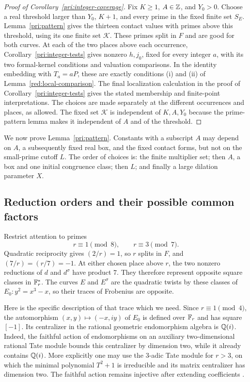 \begin{proof}[Proof of Corollary~\ref{pri:integer-coverage}]
Fix \(K\ge1\), \(A\in\mathbb Z\), and \(Y_0>0\).  Choose a real threshold
larger than \(Y_0\), \(K+1\), and every prime in the fixed finite set
\(S_E\).  Lemma~\ref{pri:pattern} gives the thirteen contact values
with primes above this threshold, using its one finite set
\(\mathcal K\).  These primes split in \(F\) and are good for both
curves.  At each of the two places above each occurrence,
Corollary~\ref{pri:integer-tests} gives nonzero \(h,j_0\), fixed for
every integer \(a\), with its two formal-kernel conditions and valuation
comparisons.  In the identity embedding with \(T_a=aP\), these are exactly
conditions (i) and (ii) of Lemma~\ref{red:local-comparison}.  The final
localization calculation in the proof of Corollary~\ref{pri:integer-tests}
gives the stated membership and finite-point interpretations.  The choices
are made separately at the different occurrences and places, as allowed.
The fixed set \(\mathcal K\) is independent of \(K,A,Y_0\) because the
prime-pattern lemma makes it independent of \(A\) and of the threshold.
\end{proof}

We now prove Lemma~\ref{pri:pattern}. Constants with a subscript $A$ may
depend on $A$, a subsequently fixed real box, and the fixed contact
forms, but not on the small-prime cutoff $L$. The order of choices is:
the finite multiplier set; then $A$, a box and one initial congruence
class; then $L$; and finally a large dilation parameter $X$.

\subsection{Reduction orders and their possible common factors}

Restrict attention to primes
\begin{equation}\label{pri:prime-residues}
                         r\equiv1\pmod8,
                         \qquad r\equiv3\pmod7.
\end{equation}
Quadratic reciprocity gives $(2/r)=1$, so $r$ splits in $F$, and
$(7/r)=(r/7)=-1$.  At either chosen place above $r$, the two nonzero
reductions of $d$ and $d^\sigma$ have product $7$.  They therefore
represent opposite square classes in $\mathbb F_r^*$.  The curves $E$ and
$E^\sigma$ are the quadratic twists by these classes of
$E_0:y^2=x^3-x$, so their traces of Frobenius are opposite.

Here is the specific description of that trace which we need.  Since
$r\equiv1\pmod4$, the automorphism
$(x,y)\mapsto(-x,iy)$ of $E_0$ is defined over $\mathbb F_r$ and has square
$[-1]$.  Its centralizer in the rational geometric endomorphism algebra
is $\mathbb Q(i)$.  Indeed, the faithful action of endomorphisms on an auxiliary
two-dimensional rational Tate module bounds this centralizer by
dimension two, while it already contains $\mathbb Q(i)$.  More explicitly one
may use the $3$-adic Tate module for $r>3$, on which the minimal
polynomial $T^2+1$ is irreducible and its matrix centralizer has dimension
two.  The faithful action remains injective after extending coefficients
\cite[Theorem III.7.4]{Silverman2009}.

